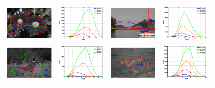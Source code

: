 \begin{figure}[ht]
\centering
\setlength{\tabcolsep}{2pt}
\begin{tabular}{|cc|cc|}
\hline
\includegraphics[width=0.24\linewidth]{figs/124084_cons_stats.pdf} &
\includegraphics[width=0.24\linewidth]{figs/124084_stats.pdf} &
\includegraphics[width=0.24\linewidth]{figs/22090_cons_stats.pdf} &
\includegraphics[width=0.24\linewidth]{figs/22090_stats.pdf} \\
\hline
\includegraphics[width=0.24\linewidth]{figs/43074_cons_stats.pdf} &
\includegraphics[width=0.24\linewidth]{figs/43074_stats.pdf} &
\includegraphics[width=0.24\linewidth]{figs/134008_cons_stats.pdf} &
\includegraphics[width=0.24\linewidth]{figs/134008_stats.pdf} \\

\end{tabular}
\end{figure}
